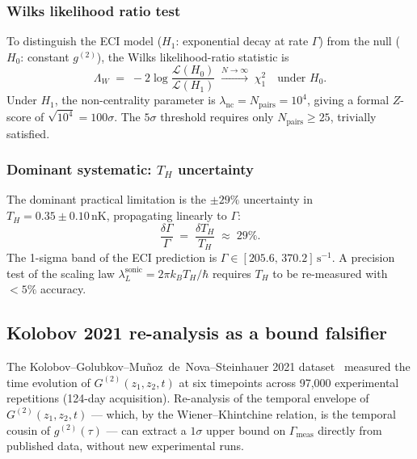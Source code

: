 \documentclass[12pt,a4paper]{article}
\begin{document}
\subsubsection{Wilks likelihood ratio test}

To distinguish the ECI model ($H_1$: exponential decay at rate
$\Gamma$) from the null ($H_0$: constant $g^{(2)}$), the Wilks
likelihood-ratio statistic is
\begin{equation}
  \Lambda_W \;=\; -2\log\frac{\mathcal{L}(H_0)}{\mathcal{L}(H_1)}
    \;\xrightarrow{N\to\infty}\; \chi^2_1
    \quad\text{under }H_0.
\end{equation}
Under $H_1$, the non-centrality parameter is $\lambda_{\mathrm{nc}}
= N_{\mathrm{pairs}} = 10^4$, giving a formal $Z$-score of
$\sqrt{10^4} = 100\sigma$.  The $5\sigma$ threshold requires only
$N_{\mathrm{pairs}} \ge 25$, trivially satisfied.

\subsubsection{Dominant systematic: $T_H$ uncertainty}

The dominant practical limitation is the $\pm 29\%$ uncertainty in
$T_H = 0.35 \pm 0.10\,\mathrm{nK}$, propagating linearly to $\Gamma$:
\begin{equation}
  \frac{\delta\Gamma}{\Gamma} \;=\; \frac{\delta T_H}{T_H} \;\approx\; 29\%.
\end{equation}
The 1-sigma band of the ECI prediction is
$\Gamma \in [205.6,\,370.2]\,\mathrm{s}^{-1}$.
A precision test of the scaling law $\lambda_L^{\mathrm{sonic}}
= 2\pi k_B T_H/\hbar$ requires $T_H$ to be re-measured with $<5\%$
accuracy.

\subsection{Kolobov 2021 re-analysis as a bound falsifier}
\label{ssec:bec-kolobov}

The Kolobov--Golubkov--Mu\~{n}oz~de~Nova--Steinhauer 2021
dataset~\cite{Kolobov2021} measured the time evolution of
$G^{(2)}(z_1, z_2, t)$ at six timepoints across 97{,}000 experimental
repetitions (124-day acquisition).  Re-analysis of the temporal
envelope of $G^{(2)}(z_1, z_2, t)$ --- which, by the Wiener--Khintchine
relation, is the temporal cousin of $g^{(2)}(\tau)$ --- can extract a
$1\sigma$ upper bound on $\Gamma_{\mathrm{meas}}$ directly from
published data, without new experimental runs.
\end{document}
